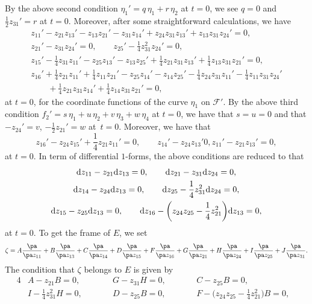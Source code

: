 By the above second condition
$\eta_1' = q\,\eta_1 + r\,\eta_2$ at $t = 0$, we see $q = 0$ and $\frac{1}{2}z_{31}' = r$ at $t = 0$.
Moreover, after some straightforward calculations, we have
\begin{gather*}
z_{11}' - z_{21}z_{13}' - z_{13}z_{21}' - z_{31}z_{14}' + z_{24}z_{31}z_{13}' + z_{13}z_{31}z_{24}' = 0,
\\
z_{21}' - z_{31}z_{24}' = 0, \qquad z_{25}' - \frac{1}{4}z_{31}^2z_{24}' = 0,
\\
z_{15}' - \frac{1}{4}z_{31}z_{11}' - z_{25}z_{13}' - z_{13}z_{25}' + \frac{1}{4}z_{21}z_{31}z_{13}' +
\frac{1}{4}z_{13}z_{31}z_{21}' = 0,
\\
z_{16}' + \frac{1}{4}z_{21}z_{11}' + \frac{1}{4}z_{11}z_{21}' - z_{25}z_{14}' - z_{14}z_{25}' - \frac{1}{4}z_{24}z_{31}z_{11}' -
\frac{1}{4}z_{11}z_{31}z_{24}' \\
\qquad{} + \frac{1}{4}z_{21}z_{31}z_{14}' + \frac{1}{4}z_{14}z_{31}z_{21}' = 0,
\end{gather*}
at $t = 0$, for the coordinate functions of the curve $\eta_1$ on ${\mathcal F}'$.
By the above third condition
$f_2' = s\,\eta_1 + u\,\eta_2 + v\,\eta_3 + w\,\eta_4$ at $t = 0$, we have that
$s = u = 0$ and that $-z_{24}' = v$, $- \frac{1}{2}z_{21}' = w$ at~$t = 0$.
Moreover, we have that
\[
z_{16}' - z_{24}z_{15}' + \frac{1}{4}z_{21}z_{11}' = 0, \qquad z_{14}' - z_{24}z_{13}' 0, z_{11}' - z_{21}z_{13}' = 0,
\]
at $t = 0$.
In term of differential $1$-forms, the above conditions are reduced to that
\begin{gather*}
{\rm d}z_{11} - z_{21}{\rm d}z_{13} = 0, \qquad {\rm d}z_{21} - z_{31}{\rm d}z_{24} = 0, \\ {\rm d}z_{14} - z_{24}{\rm d}z_{13} = 0, \qquad
{\rm d}z_{25} - \frac{1}{4}z_{31}^2{\rm d}z_{24} = 0,
\\
{\rm d}z_{15} - z_{25}{\rm d}z_{13} = 0, \qquad {\rm d}z_{16} - \biggl(z_{24}z_{25} - \frac{1}{4}z_{21}^2\biggr){\rm d}z_{13} = 0,
\end{gather*}
at $t = 0$.
To get the frame of $E$, we set
\[
\zeta = A\frac{\pa}{\pa z_{11}} + B\frac{\pa}{\pa z_{13}} + C\frac{\pa}{\pa z_{14}} + D\frac{\pa}{\pa z_{15}} +
F\frac{\pa}{\pa z_{16}} + G\frac{\pa}{\pa z_{21}} + H\frac{\pa}{\pa z_{24}} + I\frac{\pa}{\pa z_{25}} + J\frac{\pa}{\pa z_{31}}.
\]
The condition that $\zeta$ belongs to $E$ is given by
\begin{alignat*}{4}
&A - z_{21}B = 0, \qquad&& G - z_{31}H = 0, \qquad&& C - z_{25}B = 0,& \\
&I - \frac{1}{4}z_{31}^2H = 0, \qquad&& D - z_{25}B = 0, \qquad&&
F - \biggl(z_{24}z_{25} - \frac{1}{4}z_{21}^2\biggr)B = 0,&
\end{alignat*}
